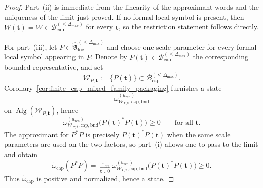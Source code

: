 \begin{proof}
Part~(ii) is immediate from the linearity of the approximant words and the uniqueness of the limit just proved.
If no formal local symbol is present, then $W(\mathbf t)=W\in\mathcal B_{\mathrm{cap}}^{(\le \Delta_{\max})}$ for every $\mathbf t$, so the restriction statement follows directly.

For part~(iii), let $P\in\widehat{\mathfrak A}_{\mathrm{loc}}^{(\le \Delta_{\max})}$ and choose one scale parameter for every formal local symbol appearing in $P$.
Denote by $P(\mathbf t)\in\mathcal B_{\mathrm{cap}}^{(\le \Delta_{\max})}$ the corresponding bounded representative, and set
\[
\mathcal W_{P,\mathbf t}:=\{P(\mathbf t)\}\subset \mathcal B_{\mathrm{cap}}^{(\le \Delta_{\max})}.
\]
Corollary~\ref{cor:finite_cap_mixed_family_packaging} furnishes a state
\[
\omega_{\mathcal W_{P,\mathbf t},\mathrm{cap,bnd}}^{(u_{\mathrm{ren}})}
\]
on $\operatorname{Alg}(\mathcal W_{P,\mathbf t})$, hence
\[
\omega_{\mathcal W_{P,\mathbf t},\mathrm{cap,bnd}}^{(u_{\mathrm{ren}})}\bigl(P(\mathbf t)^\ast P(\mathbf t)\bigr)\ge 0
\qquad\text{for all }\mathbf t.
\]
The approximant for $P^\ast P$ is precisely $P(\mathbf t)^\ast P(\mathbf t)$ when the same scale parameters are used on the two factors, so part~(i) allows one to pass to the limit and obtain
\[
\widetilde\omega_{\mathrm{cap}}(P^\ast P)
=
\lim_{\mathbf t\downarrow 0}
\omega_{\mathcal W_{P,\mathbf t},\mathrm{cap,bnd}}^{(u_{\mathrm{ren}})}\bigl(P(\mathbf t)^\ast P(\mathbf t)\bigr)
\ge 0.
\]
Thus $\widetilde\omega_{\mathrm{cap}}$ is positive and normalized, hence a state.


\end{proof}
